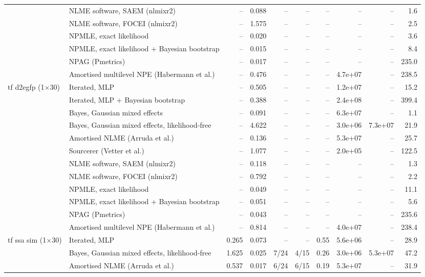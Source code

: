 \begin{tabular}{llrrrrrrrr}
 & NLME software, SAEM (nlmixr2) & -- & 0.088 & -- & -- & -- & -- & -- & 1.6 \\
 & NLME software, FOCEI (nlmixr2) & -- & 1.575 & -- & -- & -- & -- & -- & 2.5 \\
 & NPMLE, exact likelihood & -- & 0.020 & -- & -- & -- & -- & -- & 3.6 \\
 & NPMLE, exact likelihood + Bayesian bootstrap & -- & 0.015 & -- & -- & -- & -- & -- & 8.4 \\
 & NPAG (Pmetrics) & -- & 0.017 & -- & -- & -- & -- & -- & 235.0 \\
 & Amortised multilevel NPE (Habermann et al.) & -- & 0.476 & -- & -- & -- & 4.7e+07 & -- & 238.5 \\ \addlinespace
tf d2egfp (1$\times$30) & Iterated, MLP & -- & 0.505 & -- & -- & -- & 1.2e+07 & -- & 15.2 \\
 & Iterated, MLP + Bayesian bootstrap & -- & 0.388 & -- & -- & -- & 2.4e+08 & -- & 399.4 \\
 & Bayes, Gaussian mixed effects & -- & 0.091 & -- & -- & -- & 6.3e+07 & -- & 1.1 \\
 & Bayes, Gaussian mixed effects, likelihood-free & -- & 4.622 & -- & -- & -- & 3.0e+06 & 7.3e+07 & 21.9 \\
 & Amortised NLME (Arruda et al.) & -- & 0.136 & -- & -- & -- & 5.3e+07 & -- & 25.7 \\
 & Sourcerer (Vetter et al.) & -- & 1.077 & -- & -- & -- & 2.0e+05 & -- & 122.5 \\
 & NLME software, SAEM (nlmixr2) & -- & 0.118 & -- & -- & -- & -- & -- & 1.3 \\
 & NLME software, FOCEI (nlmixr2) & -- & 0.792 & -- & -- & -- & -- & -- & 2.2 \\
 & NPMLE, exact likelihood & -- & 0.049 & -- & -- & -- & -- & -- & 11.1 \\
 & NPMLE, exact likelihood + Bayesian bootstrap & -- & 0.051 & -- & -- & -- & -- & -- & 5.6 \\
 & NPAG (Pmetrics) & -- & 0.043 & -- & -- & -- & -- & -- & 235.6 \\
 & Amortised multilevel NPE (Habermann et al.) & -- & 0.814 & -- & -- & -- & 4.0e+07 & -- & 238.4 \\ \addlinespace
tf ssa sim (1$\times$30) & Iterated, MLP & 0.265 & 0.073 & -- & -- & 0.55 & 5.6e+06 & -- & 28.9 \\
 & Bayes, Gaussian mixed effects, likelihood-free & 1.625 & 0.025 & 7/24 & 4/15 & 0.26 & 3.0e+06 & 5.3e+07 & 47.2 \\
 & Amortised NLME (Arruda et al.) & 0.537 & 0.017 & 6/24 & 6/15 & 0.19 & 5.3e+07 & -- & 31.9 \\

\end{tabular}
